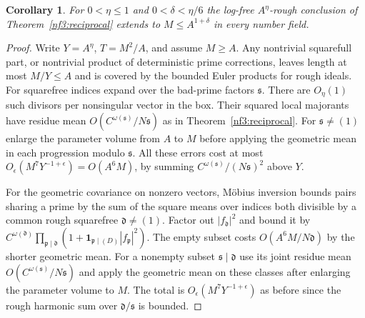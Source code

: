 \documentclass[11pt,letterpaper]{article}
\newtheorem{corollary}[corollary]{Corollary}
\theoremstyle{definition}
\numberwithin{equation}{section}
\begin{document}
\begin{corollary}\label{nf3:longrough}
For $0<\eta\le1$ and $0<\delta<\eta/6$ the log-free
$A^\eta$-rough conclusion of Theorem~\ref{nf3:reciprocal} extends
to $M\le A^{1+\delta}$ in every number field.
\end{corollary}
\begin{proof}
Write $Y=A^\eta$, $T=M^2/A$, and assume $M\ge A$.
Any nontrivial squarefull part, or nontrivial product of deterministic
prime corrections, leaves length at most $M/Y\le A$ and is covered
by the bounded Euler products for rough ideals. For squarefree indices
expand over the bad-prime factors $\mathfrak s$. There are
$O_\eta(1)$ such divisors per nonsingular vector in the box.
Their squared local majorants have residue mean
$O(C^{\omega(\mathfrak s)}/N\mathfrak s)$ as in
Theorem~\ref{nf3:reciprocal}. For $\mathfrak s\ne(1)$ enlarge the
parameter volume from $A$ to $M$ before applying the geometric mean
in each progression modulo $\mathfrak s$. All these errors cost at
most $O_\epsilon(M^7Y^{-1+\epsilon})=O(A^6M)$, by summing
$C^{\omega(\mathfrak s)}/(N\mathfrak s)^2$ above $Y$.

For the geometric covariance on nonzero vectors, M\"obius
inversion bounds pairs sharing a prime by the sum of the square
means over indices both divisible by a common rough squarefree
$\mathfrak d\ne(1)$. Factor out $|f_{\mathfrak d}|^2$ and bound it
by $C^{\omega(\mathfrak d)}\prod_{\mathfrak p\mid\mathfrak d}
(1+\mathbf1_{\mathfrak p\mid(D)}|f_{\mathfrak p}|^2)$.
The empty subset costs $O(A^6M/N\mathfrak d)$ by the shorter
geometric mean. For a nonempty subset $\mathfrak s\mid\mathfrak d$
use its joint residue mean $O(C^{\omega(\mathfrak s)}/N\mathfrak s)$
and apply the geometric mean on these classes after enlarging the
parameter volume to $M$. The total is $O_\epsilon(M^7Y^{-1+\epsilon})$
as before since the rough harmonic sum over
$\mathfrak d/\mathfrak s$ is bounded.


\end{proof}
\end{document}
